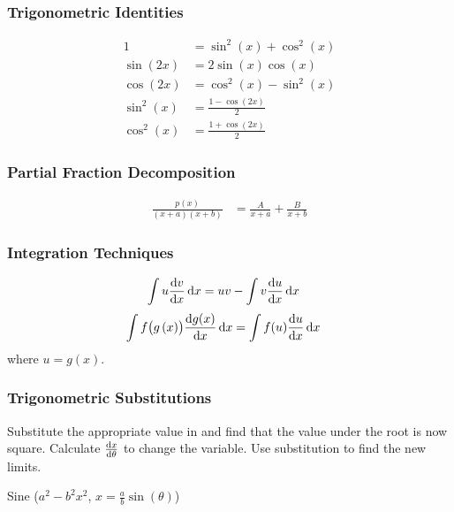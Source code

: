 \documentclass{article}
\begin{document}
\begin{multicols}{3}
    \subsubsection*{Trigonometric Identities}
    \begin{align*}
        1                        & = \sin^2{\left( x \right)} + \cos^2{\left( x \right)} \\
        \sin{\left( 2x \right)}  & = 2\sin{\left( x \right)}\cos{\left( x \right)}       \\
        \cos{\left( 2x \right)}  & = \cos^2{\left( x \right)} - \sin^2{\left( x \right)} \\
        \sin^2{\left( x \right)} & = \frac{1-\cos{\left( 2x \right)}}{2}                 \\
        \cos^2{\left( x \right)} & = \frac{1+\cos{\left( 2x \right)}}{2}
    \end{align*}
    \subsubsection*{Partial Fraction Decomposition}
    \begin{align*}
        \frac{p(x)}{(x+a)(x+b)} &= \frac{A}{x+a} + \frac{B}{x+b}
    \end{align*}
    \subsubsection*{Integration Techniques}
    \begin{align*}
        \int u \dv{v}{x}\dd{x} &= uv - \int v \dv{u}{x}\dd{x}
    \end{align*}
    \begin{align*}
        \int f\bigl(g\left( x \right)\bigr)\dv{g(x)}{x} \dd{x} & = \int f(u) \dv{u}{x}\dd{x}
    \end{align*}
    where $u = g(x)$.
    \subsubsection*{Trigonometric Substitutions}
    Substitute the appropriate value in and find that the value under the root is now square.
    Calculate $\dv{x}{\theta}$ to change the variable.
    Use substitution to find the new limits.

    Sine ($a^2-b^2x^2$, $x=\frac{a}{b}\sin{\left( \theta \right)}$)
    \begin{center}
    \end{center}


\end{multicols}
\end{document}
